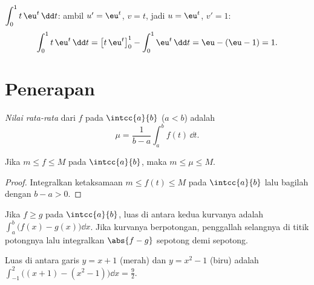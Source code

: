 \begin{example}\label{ex:g12:integ:ibp}
$\displaystyle\int_0^1 t\,\eu^{t}\,\dd t$: ambil $u' = \eu^t$, $v = t$, jadi
$u = \eu^t$, $v' = 1$:
\[
\int_0^1 t\,\eu^t\,\dd t = \bigl[t\,\eu^t\bigr]_0^1 - \int_0^1 \eu^t\,\dd t
= \eu - (\eu - 1) = 1 .
\]
\end{example}

\section{Penerapan}

\begin{definition}\label{def:g12:integ:mean}
\emph{Nilai rata-rata} dari   $f$ pada
$\intcc{a}{b}$ ($a<b$) adalah
\[
\mu = \frac{1}{b-a}\int_a^b f(t)\,\dd t .
\]
\end{definition}

\begin{proposition}\label{prop:g12:integ:meanbounds}
Jika $m \leq f \leq M$ pada $\intcc{a}{b}$, maka $m \leq \mu \leq M$.
\end{proposition}

\begin{proof}
Integralkan ketaksamaan $m \leq f(t) \leq M$ pada $\intcc{a}{b}$ lalu
bagilah dengan $b - a > 0$.
\end{proof}

\begin{method}\label{met:g12:integ:areabetween}
Jika $f \geq g$ pada $\intcc{a}{b}$, luas di antara kedua kurvanya adalah
$\int_a^b \bigl(f(x) - g(x)\bigr)\dd x$. Jika kurvanya berpotongan, penggallah
selangnya di titik potongnya lalu integralkan $\abs{f - g}$ sepotong demi sepotong.
\end{method}

\begin{omfigure}

{\small Luas di antara garis $y = x + 1$ (merah) dan 
$y = x^2 - 1$ (biru) adalah $\int_{-1}^{2}
\bigl((x+1) - (x^2-1)\bigr)\dd x = \frac92$.}
\end{omfigure}

